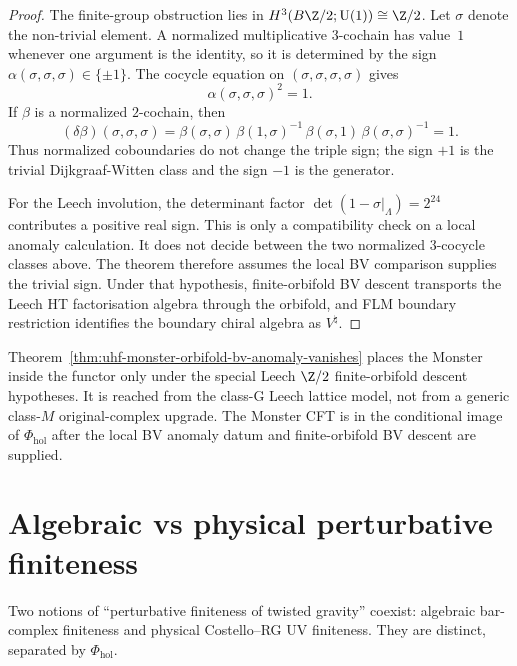 \begin{proof}
The finite-group obstruction lies in
$H^3(B\Z/2;\mathrm{U}(1))\cong\Z/2$.  Let
$\sigma$ denote the non-trivial element.  A normalized multiplicative
$3$-cochain has value~$1$ whenever one argument is the identity, so it
is determined by the sign
$\alpha(\sigma,\sigma,\sigma)\in\{\pm1\}$. The cocycle equation on
$(\sigma,\sigma,\sigma,\sigma)$ gives
\[
 \alpha(\sigma,\sigma,\sigma)^2=1.
\]
If $\beta$ is a normalized $2$-cochain, then
\[
 (\delta\beta)(\sigma,\sigma,\sigma)
 =
 \beta(\sigma,\sigma)\,
 \beta(1,\sigma)^{-1}\,
 \beta(\sigma,1)\,
 \beta(\sigma,\sigma)^{-1}
 =1.
\]
Thus normalized coboundaries do not change the triple sign; the sign
$+1$ is the trivial Dijkgraaf-Witten class and the sign $-1$ is the
generator.

For the Leech involution, the determinant factor
$\det(1-\sigma|_\Lambda)=2^{24}$ contributes a positive real sign.
This is only a compatibility check on a local anomaly calculation. It
does not decide between the two normalized $3$-cocycle classes above.
The theorem therefore assumes the local BV comparison supplies the
trivial sign. Under that hypothesis, finite-orbifold BV descent
transports the Leech HT factorisation algebra through the orbifold,
and FLM boundary restriction identifies the boundary chiral algebra as
$V^\natural$.
\end{proof}

\begin{remark}
\label{rem:uhf-monster-functor-value}
Theorem~\ref{thm:uhf-monster-orbifold-bv-anomaly-vanishes} places
the Monster inside the functor only under the special Leech $\Z/2$
finite-orbifold descent hypotheses. It is reached from the class-G
Leech lattice model, not from a generic class-$M$ original-complex
upgrade. The Monster CFT is in the conditional image of
$\Phi_{\mathrm{hol}}$ after the local BV anomaly datum and
finite-orbifold BV descent are supplied.
\end{remark}

\section{Algebraic vs physical perturbative finiteness}
\label{sec:uhf-perturbative-finiteness}

Two notions of ``perturbative finiteness of twisted gravity''
coexist: algebraic bar-complex finiteness and physical
Costello--RG UV finiteness. They are distinct, separated by
$\Phi_{\mathrm{hol}}$.

